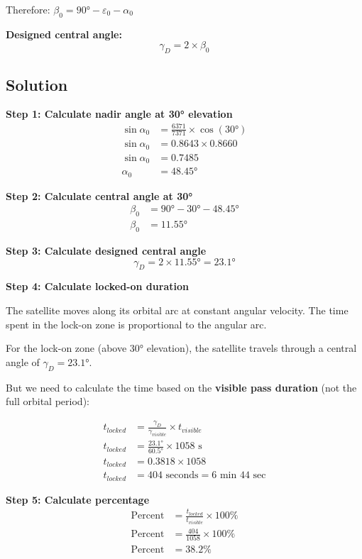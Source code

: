\documentclass[11pt,letterpaper]{article}
\begin{document}
Therefore: $\beta_0 = 90° - \varepsilon_0 - \alpha_0$

\textbf{Designed central angle:}
\begin{equation}
\gamma_D = 2 \times \beta_0
\end{equation}

\subsection{Solution}
\textbf{Step 1: Calculate nadir angle at 30° elevation}
\begin{align}
\sin \alpha_0 &= \frac{6371}{7371} \times \cos(30°) \\
\sin \alpha_0 &= 0.8643 \times 0.8660 \\
\sin \alpha_0 &= 0.7485 \\
\alpha_0 &= 48.45°
\end{align}

\textbf{Step 2: Calculate central angle at 30°}
\begin{align}
\beta_0 &= 90° - 30° - 48.45° \\
\beta_0 &= 11.55°
\end{align}

\textbf{Step 3: Calculate designed central angle}
\begin{equation}
\gamma_D = 2 \times 11.55° = 23.1°
\end{equation}

\textbf{Step 4: Calculate locked-on duration}

The satellite moves along its orbital arc at constant angular velocity. The time spent in the lock-on zone is proportional to the angular arc.

For the lock-on zone (above 30° elevation), the satellite travels through a central angle of $\gamma_D = 23.1°$.

But we need to calculate the time based on the \textbf{visible pass duration} (not the full orbital period):

\begin{align}
t_{locked} &= \frac{\gamma_D}{\gamma_{visible}} \times t_{visible} \\
t_{locked} &= \frac{23.1°}{60.5°} \times 1058 \text{ s} \\
t_{locked} &= 0.3818 \times 1058 \\
t_{locked} &= 404 \text{ seconds} = 6 \text{ min } 44 \text{ sec}
\end{align}

\textbf{Step 5: Calculate percentage}
\begin{align}
\text{Percent} &= \frac{t_{locked}}{t_{visible}} \times 100\% \\
\text{Percent} &= \frac{404}{1058} \times 100\% \\
\text{Percent} &= \boxed{38.2\%}
\end{align}
\end{document}
